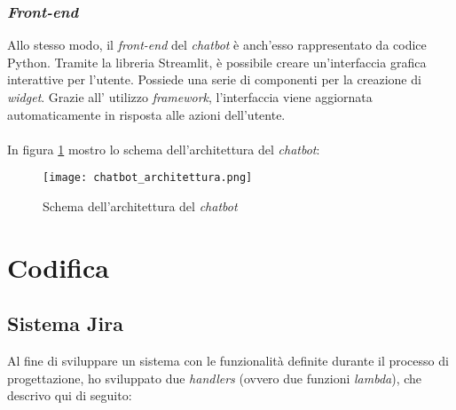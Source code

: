 \subsubsection{\textit{Front-end}}
Allo stesso modo, il \textit{front-end} del \textit{chatbot} è anch'esso rappresentato da codice Python. Tramite la libreria Streamlit, è possibile creare un'interfaccia grafica interattive per l'utente. Possiede una serie di componenti per la creazione di \textit{widget}. Grazie all' utilizzo \textit{framework}, l'interfaccia viene aggiornata automaticamente in risposta alle azioni dell'utente. \\ \\
\noindent
In figura \ref{fig:architetturaChatbot} mostro lo schema dell'architettura del \textit{chatbot}:
\begin{figure}[H]
    \centering
    \texttt{[image: chatbot\_architettura.png]}
    \caption{Schema dell'architettura del \textit{chatbot}}
    \label{fig:architetturaChatbot}
\end{figure}

\section{Codifica}
\subsection{Sistema Jira}

Al fine di sviluppare un sistema con le funzionalità definite durante il processo di progettazione, ho sviluppato due \textit{handlers} (ovvero due funzioni \textit{lambda}), che descrivo qui di seguito:

